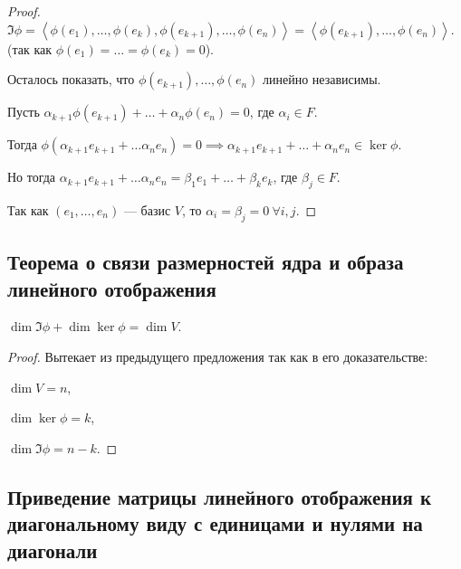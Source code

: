 \begin{proof}
    $\Im \phi = \left< \phi(e_1), \dots, \phi(e_k), \phi(e_{k + 1}), \dots, \phi(e_n) \right> = \left< \phi(e_{k + 1}), \dots, \phi(e_n) \right>$. (так как $\phi(e_1) = \dots = \phi(e_k) = 0$).

    Осталось показать, что $\phi(e_{k + 1}), \dots, \phi(e_n)$ линейно независимы.

    Пусть $\alpha_{k + 1} \phi(e_{k + 1}) + \dots + \alpha_n \phi(e_n) = 0$, где $\alpha_i \in F$.

    Тогда $\phi(\alpha_{k + 1} e_{k + 1} + \dots \alpha_n e_n) = 0 \implies \alpha_{k + 1} e_{k + 1} + \dots + \alpha_n e_n \in \ker \phi$.

    Но тогда $\alpha_{k + 1} e_{k + 1} + \dots \alpha_n e_n = \beta_1 e_1 + \dots + \beta_k e_k$, где $\beta_j \in F$.

    Так как $(e_1, \dots, e_n)$ --- базис $V$, то $\alpha_i = \beta_j = 0 \ \forall i, j$.
\end{proof}


\subsection{Теорема о связи размерностей ядра и образа линейного отображения}

\begin{theorem}
    $\dim \Im \phi + \dim \ker \phi = \dim V$.
\end{theorem}

\begin{proof}
    Вытекает из предыдущего предложения так как в его доказательстве:

    $\dim V = n$,

    $\dim \ker \phi = k$,

    $\dim \Im \phi = n - k$.
\end{proof}


\subsection{Приведение матрицы линейного отображения к диагональному виду с единицами и нулями на диагонали}

